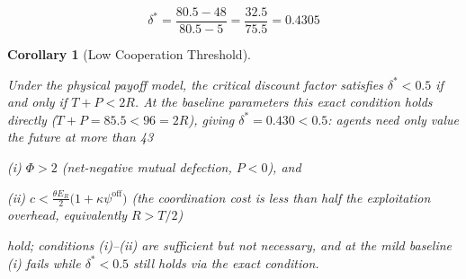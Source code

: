 \documentclass[11pt]{article}
\theoremstyle{plain}
\newtheorem{corollary}[theorem]{Corollary}
\theoremstyle{definition}
\theoremstyle{remark}
\begin{document}
\[\delta^* = \frac{80.5 - 48}{80.5 - 5} = \frac{32.5}{75.5} = 0.4305\]

\begin{corollary}[Low Cooperation Threshold]
\label{cor-low-cooperation-threshold}

Under the physical payoff model, the critical discount factor satisfies $\delta^* < 0.5$ if and only if $T + P < 2R$. At the baseline parameters this exact condition holds directly ($T + P = 85.5 < 96 = 2R$), giving $\delta^* = 0.430 < 0.5$: agents need only value the future at more than 43%

(i) $\Phi > 2$ (net-negative mutual defection, $P < 0$), and

(ii) $c < \frac{\theta E_R}{2}\bigl(1 + \kappa\psi^{\text{off}}\bigr)$ (the coordination cost is less than half the exploitation overhead, equivalently $R > T/2$)

hold; conditions (i)–(ii) are sufficient but not necessary, and at the mild baseline (i) fails while $\delta^* < 0.5$ still holds via the exact condition.
\end{corollary}
\end{document}
